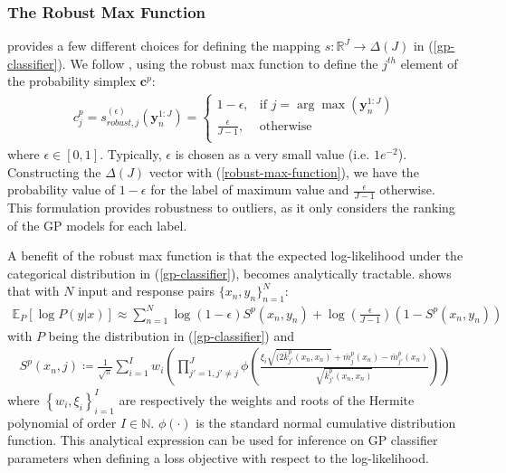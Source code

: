 \documentclass{article}
\numberwithin{equation}{section}
\begin{document}
\subsubsection{The Robust Max Function}\label{section:robust-max=function}
\cite{matthews2017scalable} provides a few different choices for defining the mapping $s: \mathbb{R}^J \rightarrow \Delta(J)$ in (\ref{gp-classifier}). We follow \cite{wild2022generalized}, using the robust max function to define the $j^{th}$ element of the probability simplex $\mathbf{c}^p$:
\begin{align}
c^p_j = s_{robust, j}^{(\epsilon)}\left(\mathbf{y}_n^{1:J}\right) = \begin{cases}
      1-\epsilon, &  \text{if } j = \arg \max\left(\mathbf{y}_n^{1:J}\right) \\
      \frac{\epsilon}{J-1}, & \text{otherwise} \\
   \end{cases}
   \label{robust-max-function}
\end{align}
where $\epsilon \in [0, 1]$. Typically, $\epsilon$ is chosen as a very small value (i.e. $1e^{-2}$). Constructing the $\Delta(J)$ vector with (\ref{robust-max-function}), we have the probability value of $1-\epsilon$ for the label of maximum value and $\frac{\epsilon}{J-1}$ otherwise. This formulation provides robustness to outliers, as it only considers the ranking of the GP models for each label.

A benefit of the robust max function is that the expected log-likelihood under the categorical distribution in (\ref{gp-classifier}), becomes analytically tractable. \cite{wild2022generalized} shows that with $N$ input and response pairs $\{x_n, y_n\}_{n=1}^N$:
\begin{align}
    \mathbb{E}_{P} \left[\log P\left(y \vert x\right)\right] \approx \sum_{n=1}^N \log(1-\epsilon) S^p(x_n, y_n) + \log\left(\frac{\epsilon}{J-1}\right) \left(1-S^p(x_n, y_n)\right)
    \label{robust-max-function-expected-log-likelihood}
\end{align}
with $P$ being the distribution in (\ref{gp-classifier}) and 
\begin{align}
    S^p(x_n, j) \coloneqq \frac{1}{\sqrt{\pi}}\sum_{i=1}^{I} w_i \left(\prod_{j'=1, j'\neq j}^J \phi\left(\frac{\xi_i\sqrt{(2 \bar{k}_{j'}^p(x_n, x_n)}+\bar{m}_{j}^p(x_n) - \bar{m}_{j'}^p(x_n)}{\sqrt{\bar{k}_{j'}^p(x_n, x_n)}}\right)\right)
\end{align}
where $\left\{w_i, \xi_i\right\}_{i=1}^I$ are respectively the weights and roots of the Hermite polynomial of order $I \in \mathbb{N}$. $\phi(\cdot)$ is the standard normal cumulative distribution function. This analytical expression can be used for inference on GP classifier parameters when defining a loss objective with respect to the log-likelihood.
\end{document}
